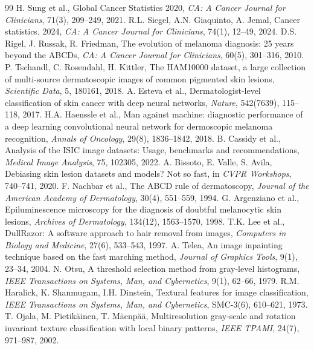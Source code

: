 \documentclass[12pt,a4paper]{article}
\begin{document}
\begin{thebibliography}{99}
 H. Sung et al., Global Cancer Statistics 2020, \textit{CA: A Cancer Journal for Clinicians}, 71(3), 209--249, 2021.
 R.L. Siegel, A.N. Giaquinto, A. Jemal, Cancer statistics, 2024, \textit{CA: A Cancer Journal for Clinicians}, 74(1), 12--49, 2024.
 D.S. Rigel, J. Russak, R. Friedman, The evolution of melanoma diagnosis: 25 years beyond the ABCDs, \textit{CA: A Cancer Journal for Clinicians}, 60(5), 301--316, 2010.
 P. Tschandl, C. Rosendahl, H. Kittler, The HAM10000 dataset, a large collection of multi-source dermatoscopic images of common pigmented skin lesions, \textit{Scientific Data}, 5, 180161, 2018.
 A. Esteva et al., Dermatologist-level classification of skin cancer with deep neural networks, \textit{Nature}, 542(7639), 115--118, 2017.
 H.A. Haenssle et al., Man against machine: diagnostic performance of a deep learning convolutional neural network for dermoscopic melanoma recognition, \textit{Annals of Oncology}, 29(8), 1836--1842, 2018.
 B. Cassidy et al., Analysis of the ISIC image datasets: Usage, benchmarks and recommendations, \textit{Medical Image Analysis}, 75, 102305, 2022.
 A. Bissoto, E. Valle, S. Avila, Debiasing skin lesion datasets and models? Not so fast, in \textit{CVPR Workshops}, 740--741, 2020.
 F. Nachbar et al., The ABCD rule of dermatoscopy, \textit{Journal of the American Academy of Dermatology}, 30(4), 551--559, 1994.
 G. Argenziano et al., Epiluminescence microscopy for the diagnosis of doubtful melanocytic skin lesions, \textit{Archives of Dermatology}, 134(12), 1563--1570, 1998.
 T.K. Lee et al., DullRazor: A software approach to hair removal from images, \textit{Computers in Biology and Medicine}, 27(6), 533--543, 1997.
 A. Telea, An image inpainting technique based on the fast marching method, \textit{Journal of Graphics Tools}, 9(1), 23--34, 2004.
 N. Otsu, A threshold selection method from gray-level histograms, \textit{IEEE Transactions on Systems, Man, and Cybernetics}, 9(1), 62--66, 1979.
 R.M. Haralick, K. Shanmugam, I.H. Dinstein, Textural features for image classification, \textit{IEEE Transactions on Systems, Man, and Cybernetics}, SMC-3(6), 610--621, 1973.
 T. Ojala, M. Pietik{\"a}inen, T. M{\"a}enp{\"a}{\"a}, Multiresolution gray-scale and rotation invariant texture classification with local binary patterns, \textit{IEEE TPAMI}, 24(7), 971--987, 2002.

\end{thebibliography}
\end{document}
